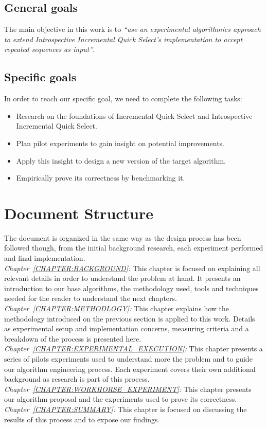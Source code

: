 \subsection{General goals}
The main objective in this work is to \emph{``use an experimental algorithmics approach to extend Introspective Incremental Quick Select's implementation to accept repeated sequences as input''}.\\

\subsection{Specific goals}
In order to reach our specific goal, we need to complete the following tasks:

\begin{itemize}
    \item Research on the foundations of Incremental Quick Select and Introspective Incremental Quick Select.
    \item Plan pilot experiments to gain insight on potential improvements.
    \item Apply this insight to design a new version of the target algorithm.
    \item Empirically prove its correctness by benchmarking it. 
\end{itemize}

\section{Document Structure}
The document is organized in the same way as the design process has been followed though, from the initial background research, each experiment performed and final implementation.\\

\emph{Chapter~\ref{CHAPTER:BACKGROUND}:} This chapter is focused on explaining all relevant details in order to understand the problem at hand. It presents an introduction to our base algorithms, the methodology used, tools and techniques needed for the reader to understand the next chapters.\\

\emph{Chapter~\ref{CHAPTER:METHODLOGY}:} This chapter explains how the methodology introduced on the previous section is applied to this work. Details as experimental setup and implementation concerns,
measuring criteria and a breakdown of the process is presented here.\\

\emph{Chapter~\ref{CHAPTER:EXPERIMENTAL_EXECUTION}:} This chapter presents a series of pilots experiments used to understand more the problem and to guide our algorithm engineering process. Each experiment covers their own additional background as research is part of this process.\\

\emph{Chapter~\ref{CHAPTER:WORKHORSE_EXPERIMENT}:} This chapter presents our algorithm proposal and the experiments used to prove its correctness.\\

\emph{Chapter~\ref{CHAPTER:SUMMARY}:} This chapter is focused on discussing the results of this process and to expose our findings.